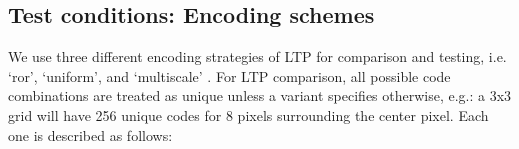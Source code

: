 \documentclass[runningheads]{llncs}
\begin{document}






\subsection{Test conditions: Encoding schemes}

We use three different encoding strategies of LTP for comparison and testing, i.e. ‘ror’, ‘uniform’, and ‘multiscale’ \cite{ji2018MedianLocalTernary}. For LTP comparison, all possible code combinations are treated as unique unless a variant specifies otherwise, e.g.: a 3x3 grid will have 256 unique codes for 8 pixels surrounding the center pixel. Each one is described as follows: 
\end{document}
